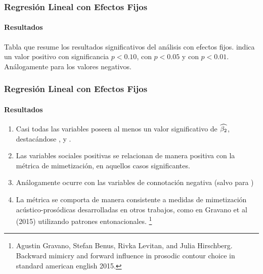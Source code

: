 \begin{frame}
\frametitle{Regresión Lineal con Efectos Fijos}
\framesubtitle{Resultados}

\begin{table}
  
\end{table}

Tabla que resume los resultados significativos del análisis con efectos fijos. \psl indica un valor positivo con significancia $p < 0.10$,  \ppsl con $p < 0.05$  y \pppsl con $p < 0.01$. Análogamente para los valores negativos.

\end{frame}


\begin{frame}
\frametitle{Regresión Lineal con Efectos Fijos}
\framesubtitle{Resultados}
\begin{enumerate}
  \item Casi todas las variables \ap poseen al menos un valor significativo de $\widehat{\beta_2}$, destacándose \ENGMEAN, \NOISETOHARMONICS y \FOMEAN.
  \item Las variables sociales positivas se relacionan de manera positiva con la métrica de mimetización, en aquellos casos significantes.
  \item Análogamente ocurre con las variables de connotación negativa (salvo \svdifficult para \ENGMEAN)
  \item La métrica se comporta de manera consistente a medidas de mimetización acústico-prosódicas desarrolladas en otros trabajos, como en Gravano et al (2015) utilizando patrones entonacionales. \footnote{Agustin Gravano, Stefan Benus, Rivka Levitan, and Julia Hirschberg. Backward mimicry and forward influence in prosodic contour choice in standard american english 2015.}
\end{enumerate}
\end{frame}
